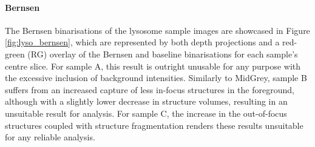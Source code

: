 \paragraph{Bernsen} The Bernsen binarisations of the lysosome sample images are showcased in Figure \ref{fig:lyso_bernsen}, which are represented by both depth projections and a red-green (RG) overlay of the Bernsen and baseline binarisations for each sample's centre slice. For sample A, this result is outright unusable for any purpose with the excessive inclusion of background intensities. Similarly to MidGrey, sample B suffers from an increased capture of less in-focus structures in the foreground, although with a slightly lower decrease in structure volumes, resulting in an unsuitable result for analysis. For sample C, the increase in the out-of-focus structures coupled with structure fragmentation renders these results unsuitable for any reliable analysis. 

